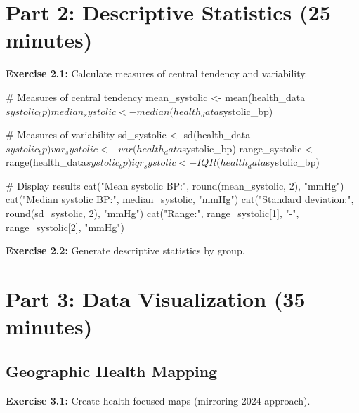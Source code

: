 \documentclass[11pt]{article}
\begin{document}
\section{Part 2: Descriptive Statistics (25 minutes)}

\textbf{Exercise 2.1:} Calculate measures of central tendency and variability.

\begin{rcode}
# Measures of central tendency
mean_systolic <- mean(health_data$systolic_bp)
median_systolic <- median(health_data$systolic_bp)

# Measures of variability
sd_systolic <- sd(health_data$systolic_bp)
var_systolic <- var(health_data$systolic_bp)
range_systolic <- range(health_data$systolic_bp)
iqr_systolic <- IQR(health_data$systolic_bp)

# Display results
cat("Mean systolic BP:", round(mean_systolic, 2), "mmHg\n")
cat("Median systolic BP:", median_systolic, "mmHg\n")
cat("Standard deviation:", round(sd_systolic, 2), "mmHg\n")
cat("Range:", range_systolic[1], "-", range_systolic[2], "mmHg\n")
\end{rcode}

\textbf{Exercise 2.2:} Generate descriptive statistics by group.


\section{Part 3: Data Visualization (35 minutes)}

\subsection{Geographic Health Mapping}

\textbf{Exercise 3.1:} Create health-focused maps (mirroring 2024 approach).
\end{document}
